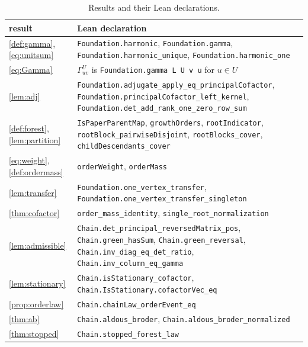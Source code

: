 \documentclass[onefignum,onetabnum,nohypdvips]{siamart250211}
\numberwithin{theorem}{section}
\numberwithin{equation}{section}
\begin{document}
\begin{table}[ht]
\caption{Results and their Lean declarations.}\label{tab:lean}
\centering
\footnotesize
\begin{tabular}{@{}>{\raggedright\arraybackslash}p{3.3cm}>{\raggedright\arraybackslash}p{8.4cm}@{}}
\toprule
result & Lean declaration \\
\midrule
\cref{def:gamma}, \eqref{eq:unitsum} & \texttt{Foundation.harmonic}, \texttt{Foundation.gamma}, \texttt{Foundation.harmonic\_unique}, \texttt{Foundation.harmonic\_one} \\
\eqref{eq:Gamma} & $\Gamma^U_{uv}$ is \texttt{Foundation.gamma L U v u} for $u\in U$ \\
\cref{lem:adj} & \texttt{Foundation.adjugate\_apply\_eq\_principalCofactor}, \texttt{Foundation.principalCofactor\_left\_kernel}, \texttt{Foundation.det\_add\_rank\_one\_zero\_row\_sum} \\
\cref{def:forest}, \cref{lem:partition} & \texttt{IsPaperParentMap}, \texttt{growthOrders}, \texttt{rootIndicator}, \texttt{rootBlock\_pairwiseDisjoint}, \texttt{rootBlocks\_cover}, \texttt{childDescendants\_cover} \\
\eqref{eq:weight}, \cref{def:ordermass} & \texttt{orderWeight}, \texttt{orderMass} \\
\cref{lem:transfer} & \texttt{Foundation.one\_vertex\_transfer}, \texttt{Foundation.one\_vertex\_transfer\_singleton} \\
\cref{thm:cofactor} & \texttt{order\_mass\_identity}, \texttt{single\_root\_normalization} \\
\cref{lem:admissible} & \texttt{Chain.det\_principal\_reversedMatrix\_pos}, \texttt{Chain.green\_hasSum}, \texttt{Chain.green\_reversal}, \texttt{Chain.inv\_diag\_eq\_det\_ratio}, \texttt{Chain.inv\_column\_eq\_gamma} \\
\cref{lem:stationary} & \texttt{Chain.isStationary\_cofactor}, \texttt{Chain.IsStationary.cofactorVec\_eq} \\
\cref{prop:orderlaw} & \texttt{Chain.chainLaw\_orderEvent\_eq} \\
\cref{thm:ab} & \texttt{Chain.aldous\_broder}, \texttt{Chain.aldous\_broder\_normalized} \\
\cref{thm:stopped} & \texttt{Chain.stopped\_forest\_law} \\
\bottomrule
\end{tabular}
\end{table}
\end{document}
